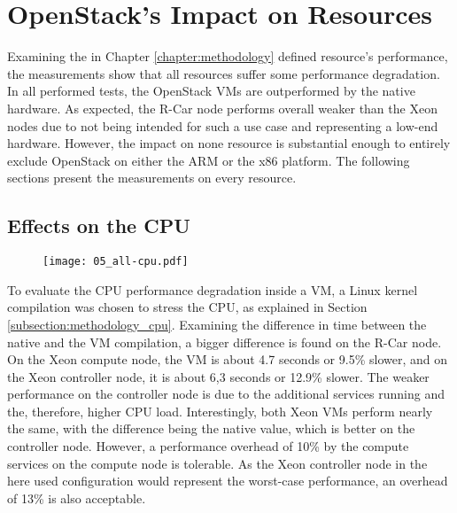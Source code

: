     \section{OpenStack's Impact on Resources}
    \label{section:evaluation_performance}
        
        Examining the in Chapter \ref{chapter:methodology} defined resource's performance, the measurements show that all resources suffer some performance degradation.
        In all performed tests, the OpenStack \acp{VM} are outperformed by the native hardware.
        As expected, the R-Car node performs overall weaker than the Xeon nodes due to not being intended for such a use case and representing a low-end hardware.
        However, the impact on none resource is substantial enough to entirely exclude OpenStack on either the ARM or the x86 platform.
        The following sections present the measurements on every resource.
        
        \subsection{Effects on the CPU}
        \label{subsection:cpu_impact}
            
            \begin{figure}[ht]
              \centering
              \texttt{[image: 05\_all-cpu.pdf]}
              \label{fig:all_cpu}
            \end{figure}
            
            \noindent To evaluate the CPU performance degradation inside a VM, a Linux kernel compilation was chosen to stress the CPU, as explained in Section \ref{subsection:methodology_cpu}.
            Examining the difference in time between the native and the \ac{VM} compilation, a bigger difference is found on the R-Car node. 
            On the Xeon compute node, the \ac{VM} is about 4.7 seconds or 9.5\% slower, and on the Xeon controller node, it is about 6,3 seconds or 12.9\% slower.
            The weaker performance on the controller node is due to the additional services running and the, therefore, higher CPU load.
            Interestingly, both Xeon \acp{VM} perform nearly the same, with the difference being the native value, which is better on the controller node.
            However, a performance overhead of 10\% by the compute services on the compute node is tolerable.
            As the Xeon controller node in the here used configuration would represent the worst-case performance, an overhead of 13\% is also acceptable.
            
